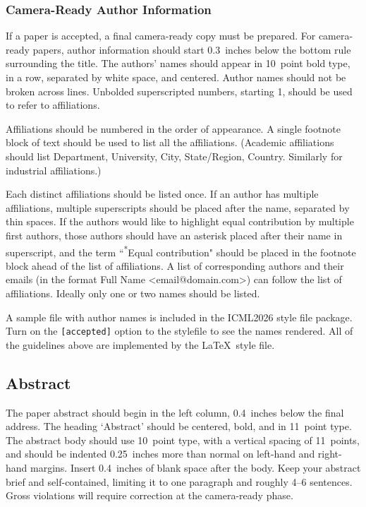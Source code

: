 \documentclass{article}
\theoremstyle{plain}
\theoremstyle{definition}
\theoremstyle{remark}
\begin{document}
\subsubsection{Camera-Ready Author Information}
\label{final author}

If a paper is accepted, a final camera-ready copy must be prepared.
%
For camera-ready papers, author information should start 0.3~inches below the
bottom rule surrounding the title. The authors' names should appear in 10~point
bold type, in a row, separated by white space, and centered. Author names should
not be broken across lines. Unbolded superscripted numbers, starting 1, should
be used to refer to affiliations.

Affiliations should be numbered in the order of appearance. A single footnote
block of text should be used to list all the affiliations. (Academic
affiliations should list Department, University, City, State/Region, Country.
Similarly for industrial affiliations.)

Each distinct affiliations should be listed once. If an author has multiple
affiliations, multiple superscripts should be placed after the name, separated
by thin spaces. If the authors would like to highlight equal contribution by
multiple first authors, those authors should have an asterisk placed after their
name in superscript, and the term ``\textsuperscript{*}Equal contribution"
should be placed in the footnote block ahead of the list of affiliations. A
list of corresponding authors and their emails (in the format Full Name
\textless{}email@domain.com\textgreater{}) can follow the list of affiliations.
Ideally only one or two names should be listed.

A sample file with author names is included in the ICML2026 style file
package. Turn on the \texttt{[accepted]} option to the stylefile to
see the names rendered. All of the guidelines above are implemented
by the \LaTeX\ style file.

\subsection{Abstract}

The paper abstract should begin in the left column, 0.4~inches below the final
address. The heading `Abstract' should be centered, bold, and in 11~point type.
The abstract body should use 10~point type, with a vertical spacing of
11~points, and should be indented 0.25~inches more than normal on left-hand and
right-hand margins. Insert 0.4~inches of blank space after the body. Keep your
abstract brief and self-contained, limiting it to one paragraph and roughly 4--6
sentences. Gross violations will require correction at the camera-ready phase.
\end{document}
